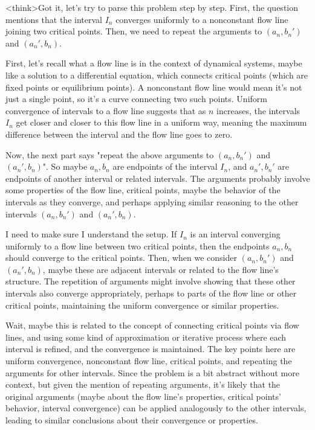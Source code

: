 <think>Got it, let's try to parse this problem step by step. First, the question mentions that the interval \( I_n \) converges uniformly to a nonconstant flow line joining two critical points. Then, we need to repeat the arguments to \( (a_n, b_n') \) and \( (a_n', b_n) \). 

First, let's recall what a flow line is in the context of dynamical systems, maybe like a solution to a differential equation, which connects critical points (which are fixed points or equilibrium points). A nonconstant flow line would mean it's not just a single point, so it's a curve connecting two such points. Uniform convergence of intervals to a flow line suggests that as \( n \) increases, the intervals \( I_n \) get closer and closer to this flow line in a uniform way, meaning the maximum difference between the interval and the flow line goes to zero.

Now, the next part says "repeat the above arguments to \( (a_n, b_n') \) and \( (a_n', b_n) \)". So maybe \( a_n, b_n \) are endpoints of the interval \( I_n \), and \( a_n', b_n' \) are endpoints of another interval or related intervals. The arguments probably involve some properties of the flow line, critical points, maybe the behavior of the intervals as they converge, and perhaps applying similar reasoning to the other intervals \( (a_n, b_n') \) and \( (a_n', b_n) \).

I need to make sure I understand the setup. If \( I_n \) is an interval converging uniformly to a flow line between two critical points, then the endpoints \( a_n, b_n \) should converge to the critical points. Then, when we consider \( (a_n, b_n') \) and \( (a_n', b_n) \), maybe these are adjacent intervals or related to the flow line's structure. The repetition of arguments might involve showing that these other intervals also converge appropriately, perhaps to parts of the flow line or other critical points, maintaining the uniform convergence or similar properties.

Wait, maybe this is related to the concept of connecting critical points via flow lines, and using some kind of approximation or iterative process where each interval is refined, and the convergence is maintained. The key points here are uniform convergence, nonconstant flow line, critical points, and repeating the arguments for other intervals. Since the problem is a bit abstract without more context, but given the mention of repeating arguments, it's likely that the original arguments (maybe about the flow line's properties, critical points' behavior, interval convergence) can be applied analogously to the other intervals, leading to similar conclusions about their convergence or properties.

